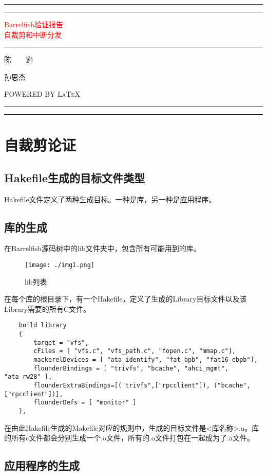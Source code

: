 \documentclass[a4paper, 12pt]{report}
\newcommand*{\plogo}{\fbox{$\mathcal{BuaaLes}$}} %
\newcommand*{\titleAT}{\begingroup %
    \newlength{\drop} %
    \drop=0.1\textheight %
    
    \centering %
    \rule{\textwidth}{1pt}\par %
    \vspace{2pt}\vspace{-\baselineskip} %
    \rule{\textwidth}{0.4pt}\par %
    
    \vspace{\drop} %
    \textcolor{Red}{ %
        {\Huge Barrelfish验证报告}\\[0.5\baselineskip] %
        {\Large 自裁剪和中断分发}} %
    
    \vspace{0.25\drop} %
    \rule{0.3\textwidth}{0.4pt}\par %
    \vspace{\drop} %
    
    {\Large 陈~~~~逊}\par %
    {\Large 孙思杰}\par %
    
    \vfill %
    {\large \textsc{POWERED BY \LaTeX}}\par %
    
    \vspace*{\drop} %
    
    \rule{\textwidth}{0.4pt}\par %
    \vspace{2pt}\vspace{-\baselineskip} %
    \rule{\textwidth}{1pt}\par %
    
    \endgroup}
\begin{document}
    
    \pagestyle{empty} %
    \titleAT %
    
    \newpage
    
    \tableofcontents
    
    \newpage
    
    \chapter{自裁剪论证}
    
    \section{Hakefile生成的目标文件类型}
    
    Hakefile文件定义了两种生成目标。一种是库，另一种是应用程序。
    
    \section{库的生成}
    
    在Barrelfish源码树中的lib文件夹中，包含所有可能用到的库。
    
    \begin{figure}[htbp]
        \centering
        \texttt{[image: ./img1.png]}
        \caption{lib列表}
        \label{fig:lib_img}
    \end{figure}
    
    在每个库的根目录下，有一个Hakefile，定义了生成的Library目标文件以及该Library需要的所有C文件。
    
    \begin{lstlisting}
    build library 
    { 
        target = "vfs",
        cFiles = [ "vfs.c", "vfs_path.c", "fopen.c", "mmap.c"],
        mackerelDevices = [ "ata_identify", "fat_bpb", "fat16_ebpb"],
        flounderBindings = [ "trivfs", "bcache", "ahci_mgmt", "ata_rw28" ],
        flounderExtraBindings=[("trivfs",["rpcclient"]), ("bcache", ["rpcclient"])],
        flounderDefs = [ "monitor" ]
    },
    \end{lstlisting}
    
    在由此Hakefile生成的Makefile对应的规则中，生成的目标文件是<库名称>.a。库的所有c文件都会分别生成一个.o文件，所有的.o文件打包在一起成为了.a文件。
    
    \section{应用程序的生成}
    
\end{document}
